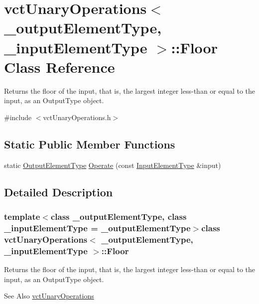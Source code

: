 \hypertarget{classvct_unary_operations_1_1_floor}{\section{vct\-Unary\-Operations$<$ \-\_\-output\-Element\-Type, \-\_\-input\-Element\-Type $>$\-:\-:Floor Class Reference}
\label{classvct_unary_operations_1_1_floor}
}


Returns the floor of the input, that is, the largest integer less-\/than or equal to the input, as an Output\-Type object.  




{\ttfamily \#include $<$vct\-Unary\-Operations.\-h$>$}

\subsection*{Static Public Member Functions}
\begin{DoxyCompactItemize}
\item 
static \hyperlink{classvct_unary_operations_a42306ac3dd20d32c6d6c66ac3fa2e7b9}{Output\-Element\-Type} \hyperlink{classvct_unary_operations_1_1_floor_a764908396e241a3b9505b453f75cd54f}{Operate} (const \hyperlink{classvct_unary_operations_abf3b77bb7b8abd7ba72a6a45a65696a7}{Input\-Element\-Type} \&input)
\end{DoxyCompactItemize}


\subsection{Detailed Description}
\subsubsection*{template$<$class \-\_\-output\-Element\-Type, class \-\_\-input\-Element\-Type = \-\_\-output\-Element\-Type$>$class vct\-Unary\-Operations$<$ \-\_\-output\-Element\-Type, \-\_\-input\-Element\-Type $>$\-::\-Floor}

Returns the floor of the input, that is, the largest integer less-\/than or equal to the input, as an Output\-Type object. 

\begin{DoxySeeAlso}{See Also}
\hyperlink{classvct_unary_operations}{vct\-Unary\-Operations} 
\end{DoxySeeAlso}


